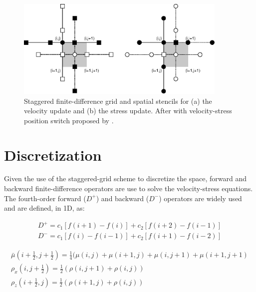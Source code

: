 \documentclass{gnulike}
\begin{document}
\begin{figure}[!ht]
  \centering
  \includegraphics[width=0.9\textwidth]{fig/staggered.eps}
  \caption{Staggered finite-difference grid and spatial stencils for (a) the velocity update and (b) the stress update. After \cite{levander1988fourth} with velocity-stress position switch proposed by \cite{bohlen2006accuracy}.}
  \label{fig:staggered-grid}
\end{figure}

\section{Discretization}

\noindent Given the use of the staggered-grid scheme to discretize the space, forward and backward finite-difference operators are use to solve the velocity-stress equations.\\


\noindent The fourth-order forward ($D^{+}$) and backward ($D^{-}$) operators are widely used and are defined, in 1D, as:

\begin{eqnarray}
  D^{+}=c_{1}[f(i+1)-f(i)]+c_{2}[f(i+2)-f(i-1)] \nonumber \\
  D^{-}=c_{1}[f(i)-f(i-1)]+c_{2}[f(i+1)-f(i-2)]
\end{eqnarray}


\begin{eqnarray}
  \bar{\mu}(i+\frac{1}{2}, j+\frac{1}{2})=\frac{1}{4}(\mu(i,j)+\mu(i+1,j)+\mu(i,j+1)+\mu(i+1,j+1) \\
  \rho_{x}(i,j+\frac{1}{2}) = \frac{1}{2}(\rho (i,j+1)+\rho(i,j)) \\
  \rho_{z}(i+\frac{1}{2},j) = \frac{1}{2}(\rho (i+1,j)+\rho(i,j))
\end{eqnarray}
\end{document}
